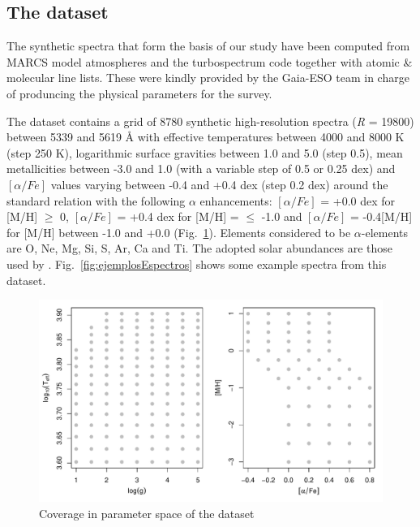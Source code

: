 \documentclass[a4paper,fleqn,usenatbib]{mnras}
\begin{document}
{{{\subsection{The dataset}

The synthetic spectra that form the basis of our study have been
computed from MARCS model atmospheres \citep{gustafsson:08} and the
turbospectrum code \citep{alvarez:98, plez:12} together with atomic \&
molecular line lists. These were kindly provided by the Gaia-ESO team
in charge of produncing the physical parameters for the survey.

The dataset contains a grid of 8780 synthetic high-resolution spectra
(\textit{R} = 19800) between 5339 and 5619 {\AA}
with effective temperatures between 4000 and 8000 K (step 250 K),
logarithmic surface gravities between 1.0 and 5.0 (step 0.5), mean
metallicities between -3.0 and 1.0 (with a variable step of 0.5 or
0.25 dex) and $\left[ \alpha/Fe \right]$ values varying between -0.4
and +0.4 dex (step 0.2 dex) around the standard relation with the
following $\alpha$ enhancements: $\left[ \alpha/Fe \right]$ = +0.0 dex
for [M/H] $\geqslant$ 0, $\left[ \alpha/Fe \right]$ = +0.4 dex for
[M/H] = $\leqslant$ -1.0 and $\left[ \alpha/Fe \right]$ = -0.4[M/H]
for [M/H] between -1.0 and +0.0 (Fig.~\ref{fig:gridModelos}).
Elements considered to be $\alpha$-elements are O, Ne, Mg, Si, S, Ar,
Ca and Ti. The adopted solar abundances are those used by
\citep{gustafsson:08}.  Fig.~\ref{fig:ejemplosEspectros} shows some
example spectra from this dataset. 

\begin{figure}
\centering\includegraphics[width=\columnwidth]{grid_modelos.pdf}
\caption{Coverage in parameter space of the dataset}
\label{fig:gridModelos}
\end{figure}

}}}
\end{document}
